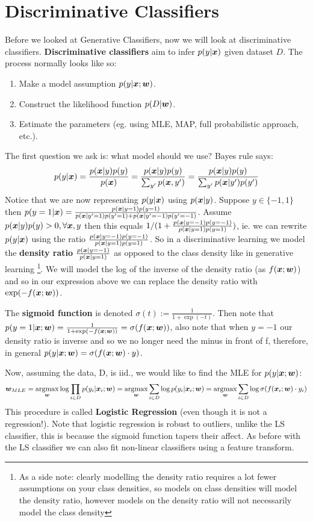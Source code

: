 \section{Discriminative Classifiers} \label{section:Discriminative-classifiers}
Before we looked at Generative Classifiers, now we will look at discriminative classifiers. \textbf{Discriminative classifiers} aim to infer $p(y|\bm{x})$ given dataset $D$. The process normally looks like so:
\begin{enumerate}
    \item Make a model assumption $p(y|\bm{x};\bm{w})$.
    \item Construct the likelihood function $p(D|\bm{w})$.
    \item Estimate the parameters (eg. using MLE, MAP, full probabilistic approach, etc.).
\end{enumerate}
The first question we ask is: what model should we use? Bayes rule says:
\begin{equation}
    p(y|\bm{x}) = \frac{p(\bm{x}|y) p(y)}{p(\bm{x})} = \frac{p(\bm{x}|y)p(y)}{\sum_{y'} p(\bm{x},y')} = \frac{p(\bm{x}|y) p(y)}{\sum_{y'} p(\bm{x}|y')p(y')}
\end{equation}
Notice that we are now representing $p(y|\bm{x})$ using $p(\bm{x}|y)$. Suppose $y \in \{-1,1\}$ then $p(y=1|\bm{x}) = \frac{p(\bm{x}|y=1)p(y=1)}{p(\bm{x}|y'=1)p(y'=1) + p(\bm{x}|y'=-1)p(y'=-1)}$. Assume $p(\bm{x}|y) p(y) >0, \forall \bm{x},y$ then this equals $1 / (1 + \frac{p(\bm{x}|y=-1)p(y=-1)}{p(\bm{x}|y=1)p(y=1)})$, ie. we can rewrite $p(y|\bm{x})$ using the ratio $\frac{p(\bm{x}|y=-1)p(y=-1)}{p(\bm{x}|y=1)p(y=1)}$. So in a discriminative learning we model the \textbf{density ratio} $\frac{p(\bm{x}|y=-1)}{p(\bm{x}|y=1)}$ as opposed to the class density like in generative learning \footnote{As a side note: clearly modelling the density ratio requires a lot fewer assumptions on your class densities, so models on class densities will model the density ratio, however models on the density ratio will not necessarily model the class density}. We will model the log of the inverse of the density ratio (as $f(\bm{x};\bm{w})$) and so in our expression above we can replace the density ratio with $\exp(-f(\bm{x};\bm{w}))$.

The \textbf{sigmoid function} is denoted $\sigma(t) := \frac{1}{1+\exp(-t)}$. Then note that $p(y=1|\bm{x};\bm{w}) = \frac{1}{1+\exp(-f(\bm{x};\bm{w}))} = \sigma(f(\bm{x};\bm{w}))$, also note that when $y=-1$ our density ratio is inverse and so we no longer need the minus in front of f, therefore, in general $p(y|\bm{x};\bm{w}) = \sigma(f(\bm{x};\bm{w}) \cdot y)$. 

Now, assuming the data, D, is iid., we would like to find the MLE for $p(y|\bm{x};\bm{w})$:
\begin{equation}
    \bm{w}_{MLE} = \operatorname*{arg\!\max}_{\bm{w}} \log \prod_{i \in D} p(y_{i} | \bm{x}_{i}; \bm{w}) = \operatorname*{arg\!\max}_{\bm{w}} \sum_{i \in D} \log p(y_{i} | \bm{x}_{i};\bm{w}) = \operatorname*{arg\!\max}_{\bm{w}} \sum_{i\in D} \log \sigma(f(\bm{x}_{i};\bm{w}) \cdot y_{i})
\end{equation}
This procedure is called \textbf{Logistic Regression} (even though it is not a regression!). Note that logistic regression is robust to outliers, unlike the LS classifier, this is because the sigmoid function tapers their affect. As before with the LS classifier we can also fit non-linear classifiers using a feature transform.

